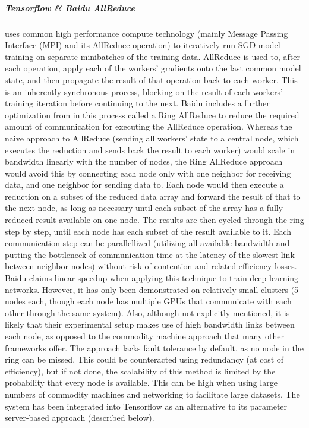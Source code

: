 \subparagraph{Tensorflow \& Baidu AllReduce \citep{BaiduAllReduce2017}}

uses common high performance compute technology (mainly Message Passing Interface (MPI) and its AllReduce operation) to iteratively run SGD model training on separate minibatches of the training data. AllReduce is used to, after each operation, apply each of the workers’ gradients onto the last common model state, and then propagate the result of that operation back to each worker. This is an inherently synchronous process, blocking on the result of each workers’ training iteration before continuing to the next.
Baidu includes a further optimization from \citet{Patarasuk2009} in this process called a Ring AllReduce to reduce the required amount of communication for executing the AllReduce operation. Whereas the naive approach to AllReduce (sending all workers’ state to a central node, which executes the reduction and sends back the result to each worker) would scale in bandwidth linearly with the number of nodes, the Ring AllReduce approach would avoid this by connecting each node only with one neighbor for receiving data, and one neighbor for sending data to. Each node would then execute a reduction on a subset of the reduced data array and forward the result of that to the next node, as long as necessary until each subset of the array has a fully reduced result available on one node. The results are then cycled through the ring step by step, until each node has each subset of the result available to it. Each communication step can be parallellized (utilizing all available bandwidth and putting the bottleneck of communication time at the latency of the slowest link between neighbor nodes) without risk of contention and related efficiency losses.
Baidu claims linear speedup when applying this technique to train deep learning networks. However, it has only been demonstrated on relatively small clusters (5 nodes each, though each node has multiple GPUs that communicate with each other through the same system). Also, although not explicitly mentioned, it is likely that their experimental setup makes use of high bandwidth links between each node, as opposed to the commodity machine approach that many other frameworks offer. The approach lacks fault tolerance by default, as no node in the ring can be missed. This could be counteracted using redundancy (at cost of efficiency), but if not done, the scalability of this method is limited by the probability that every node is available. This can be high when using large numbers of commodity machines and networking to facilitate large datasets.
The system has been integrated into Tensorflow as an alternative to its parameter server-based approach (described below).

